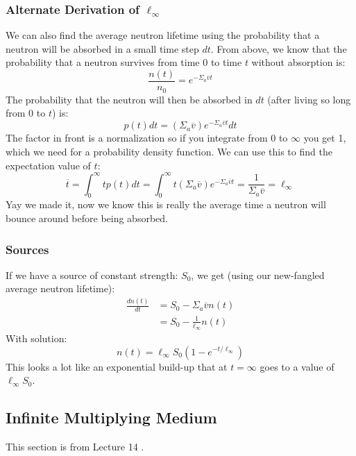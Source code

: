 \documentclass[letter]{article}
\begin{document}
\subsubsection{Alternate Derivation of $\ell_\infty$}

We can also find the average neutron lifetime using the probability
that a neutron will be absorbed in a small time step $dt$. From above,
we know that the probability that a neutron survives from time 0 to
time $t$ without absorption is:
\begin{equation*}
    \frac{n(t)}{n_0}=e^{-\Sigma_a\overline{v}t}
\end{equation*}
The probability that the neutron will then be absorbed in $dt$ (after living
so long from 0 to $t$) is:
\begin{equation*}
  p(t)dt=(\Sigma_a\overline{v})e^{-\Sigma_a\overline{v}t}dt
\end{equation*}
The factor in front is a normalization so if you integrate from 0 to
$\infty$ you get 1, which we need for a probability density
function. We can use this to find the expectation value of $t$:
\begin{equation*}
  \overline{t}=\int^\infty_0tp(t)dt = \int^\infty_0t(\Sigma_a\overline{v})e^{-\Sigma_a\overline{v}t}=\frac{1}{\Sigma_a\overline{v}}=\ell_\infty
\end{equation*}
Yay we made it, now we know this is really the average time a neutron will bounce
around before being absorbed.

\subsubsection{Sources}

If we have a source of constant strength: $S_0$, we get (using our
new-fangled average neutron lifetime):
\begin{equation*}
  \begin{split}
    \frac{dn(t)}{dt}&=S_0-\Sigma_a\overline{v}n(t) \\
    &= S_0-\frac{1}{\ell_\infty}n(t)
  \end{split}
\end{equation*}
With solution:
\begin{equation*}
  n(t)=\ell_\infty S_0(1-e^{-t/\ell_\infty})
\end{equation*}
This looks a lot like an exponential build-up that at $t=\infty$ goes
to a value of $\ell_\infty S_0$.

\subsection{Infinite Multiplying Medium}
This section is from Lecture 14 \cite{lecture}.
\end{document}
